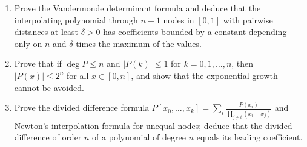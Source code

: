 \documentclass[11pt,a4paper]{article}
\renewcommand{\le}{\leqslant}
\begin{document}
\begin{enumerate}[leftmargin=2.2em,itemsep=0.6em]
\item Prove the Vandermonde determinant formula and deduce that the interpolating polynomial
through $n+1$ nodes in $[0,1]$ with pairwise distances at least $\delta>0$ has coefficients bounded
by a constant depending only on $n$ and $\delta$ times the maximum of the values.

\item Prove that if $\deg P\le n$ and $|P(k)|\le1$ for $k=0,1,\dots,n$, then $|P(x)|\le2^n$ for all
$x\in[0,n]$, and show that the exponential growth cannot be avoided.

\item Prove the divided difference formula
$P[x_0,\dots,x_k]=\sum_i\frac{P(x_i)}{\prod_{j\ne i}(x_i-x_j)}$ and Newton's interpolation formula
for unequal nodes; deduce that the divided difference of order $n$ of a polynomial of degree $n$
equals its leading coefficient.
\end{enumerate}
\end{document}

